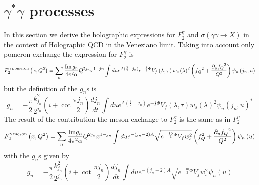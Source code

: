 \documentclass[a4paper,12pt]{article}
\begin{document}
\section{$\gamma^{*} \gamma$ processes}

In this section we derive the holographic expressions for $F_2^\gamma$ and $\sigma\left(\gamma \gamma \rightarrow X\right)$ in the context of Holographic QCD in the Veneziano limit. Taking into account only pomeron exchange the expression for $F_2^\gamma$ is
\begin{equation}
F_2^{\gamma \, {\rm pomeron}}\left(x, Q^2\right) = \sum_n \frac{{\rm Im} \, g_n}{4 \pi^2 \alpha} Q^{2 j_n} x^{1-jn} \int du e^{A(\frac{3}{2} - j_n)}  e^{-\frac{7}{3} \Phi}  V_f \left( \lambda, \tau \right) {w_s\left(\lambda \right)}^2  \left(  {f_Q}^2 + \frac{{\partial_u f_Q}^2}{Q^2}  \right) \psi_n \left(j_n, u\right)
\end{equation}
but the definition of the $g_n$s is
\begin{equation}
g_n = - \frac{\pi}{2} \frac{k^2_{j_n}}{2^{j_n}}  \left(i + \cot \frac{\pi j_n}{2} \right) \frac{d j_n}{dt}  \int du e^{A(\frac{3}{2} - j_n)}  e^{-\frac{7}{3} \Phi}  V_f \left( \lambda, \tau \right) {w_s\left(\lambda \right)}^2  \psi_n \left(j_n, u\right)^*
\end{equation}
The result of the contribution the meson exchange to $F_2^\gamma$ is the same as in $F_2^p$
\begin{equation}
F_2^{\gamma \, {\rm meson}}\left(x, Q^2\right) = \sum_n \frac{{\rm Im} g_n }{4\pi^2 \alpha} Q^{2 j_n} x^{1-j_n} \int du e^{-\left(j_n - 2 \right)A }\sqrt{e^{-\frac{10}{3} \Phi} V_f w_s^2} \left(f_Q^2 +\frac{\partial_u{f_Q}^2}{Q^2} \right) \psi_n\left(u\right)
\end{equation}
with the $g_n$s given by
\begin{equation}
g_n = - \frac{\pi}{2} \frac{k^2_{j_n}}{2^{j_n}}  \left(i + \cot \frac{\pi j_n}{2} \right) \frac{d j_n}{dt}  \int du e^{-\left(j_n - 2 \right)A }\sqrt{e^{-\frac{10}{3} \Phi} V_f w_s^2} \psi_n\left(u\right)
\end{equation}
\end{document}
